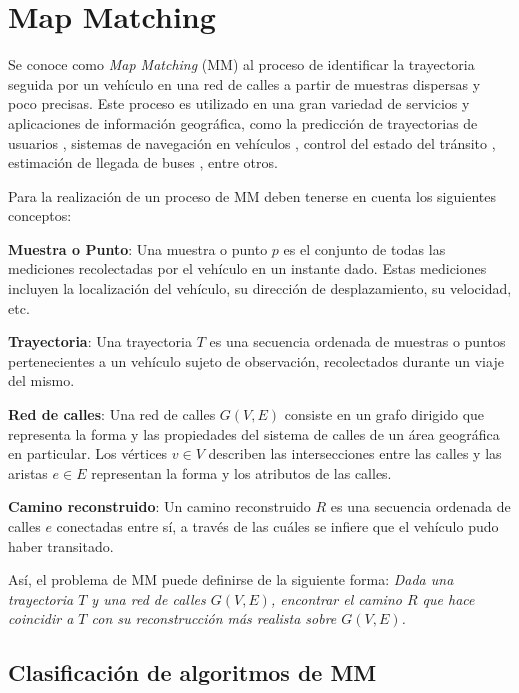 \section{Map Matching}
\label{sec:map_matching}

Se conoce como \emph{Map Matching} (MM) al proceso de identificar la trayectoria seguida por un vehículo en una red de calles a partir de muestras dispersas y poco precisas. Este proceso es utilizado en una gran variedad de servicios y aplicaciones de información geográfica, como la predicción de trayectorias de usuarios \cite{eisner2011algorithms}, sistemas de navegación en vehículos \cite{kim2001adaptive}, control del estado del tránsito \cite{thiagarajan2009vtrack}, estimación de llegada de buses \cite{thiagarajan2010cooperative}, entre otros.

Para la realización de un proceso de MM deben tenerse en cuenta los siguientes conceptos:

\textbf{Muestra o Punto}: Una muestra o punto $p$ es el conjunto de todas las mediciones recolectadas por el vehículo en un instante dado. Estas mediciones incluyen la localización del vehículo, su dirección de desplazamiento, su velocidad, etc.

\textbf{Trayectoria}: Una trayectoria $T$ es una secuencia ordenada de muestras o puntos pertenecientes a un vehículo sujeto de observación, recolectados durante un viaje del mismo.

\textbf{Red de calles}: Una red de calles $G(V,E)$ consiste en un grafo dirigido que representa la forma y las propiedades del sistema de calles de un área geográfica en particular. Los vértices $v \in V$ describen las intersecciones entre las calles y las aristas $e \in E$ representan la forma y los atributos de las calles.

\textbf{Camino reconstruido}: Un camino reconstruido $R$ es una secuencia ordenada de calles $e$  conectadas entre sí, a través de las cuáles se infiere que el vehículo pudo haber transitado.

Así, el problema de MM puede definirse de la siguiente forma: \emph{Dada una trayectoria $T$ y una red de calles $G(V,E)$, encontrar el camino $R$ que hace coincidir a $T$ con su reconstrucción más realista sobre $G(V,E)$.}

\subsection{Clasificación de algoritmos de MM}

